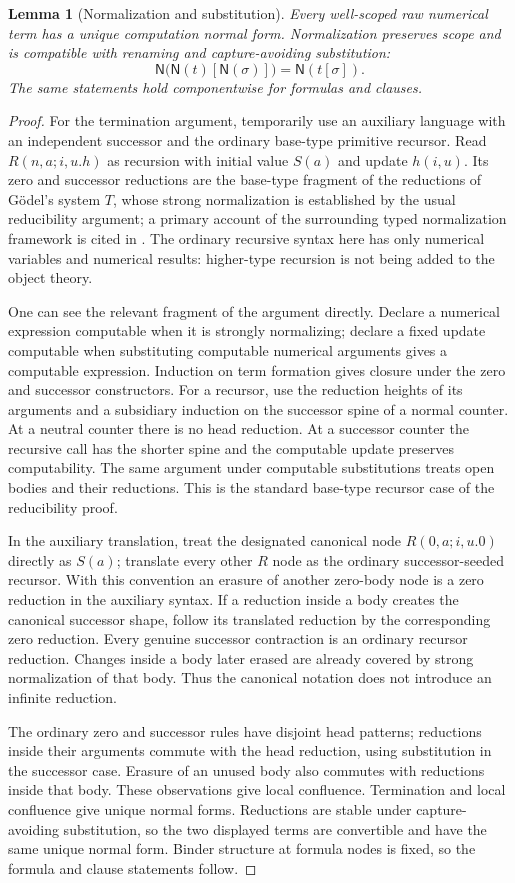 \documentclass[11pt,letterpaper]{article}
\newtheorem{lemma}[theorem]{Lemma}
\theoremstyle{definition}\newtheorem{definition}[theorem]{Definition}
\theoremstyle{remark}\newtheorem{remark}[theorem]{Remark}
\newcommand{\NF}{\mathsf N}
\begin{document}
\begin{lemma}[Normalization and substitution]\label{lem:norm}
Every well-scoped raw numerical term has a unique computation normal
form. Normalization preserves scope and is compatible with renaming
and capture-avoiding substitution:
\[
 \NF\bigl(\NF(t)[\NF(\sigma)]\bigr)=\NF(t[\sigma]).
\]
The same statements hold componentwise for formulas and clauses.
\end{lemma}
\begin{proof}
For the termination argument, temporarily use an auxiliary language with
an independent successor and the ordinary base-type primitive recursor.
Read $R(n,a;i,u.h)$ as recursion with initial value $S(a)$ and update
$h(i,u)$. Its zero and successor reductions are the base-type fragment
of the reductions of G\"odel's system $T$, whose strong normalization
is established by the usual reducibility argument; a primary account
of the surrounding typed normalization framework is cited in
\cite{urciuoli}. The ordinary recursive syntax here has only numerical
variables and numerical results: higher-type recursion is not being
added to the object theory.

One can see the relevant fragment of the argument directly. Declare
a numerical expression computable when it is strongly normalizing;
declare a fixed update computable when substituting computable
numerical arguments gives a computable expression. Induction on term
formation gives closure under the zero and successor constructors.
For a recursor, use the reduction heights of its arguments and a
subsidiary induction on the successor spine of a normal counter.
At a neutral counter there is no head reduction. At a successor
counter the recursive call has the shorter spine and the computable
update preserves computability. The same argument under computable
substitutions treats open bodies and their reductions. This is the
standard base-type recursor case of the reducibility proof.

In the auxiliary translation, treat the designated canonical node
$R(0,a;i,u.0)$ directly as $S(a)$; translate every other $R$ node as
the ordinary successor-seeded recursor. With this convention an erasure
of another zero-body node is a zero reduction in the auxiliary syntax.
If a reduction inside a body creates the canonical successor shape,
follow its translated reduction by the corresponding zero reduction.
Every genuine successor contraction
is an ordinary recursor reduction. Changes inside a body later erased
are already covered by strong normalization of that body. Thus the
canonical notation does not introduce an infinite reduction.

The ordinary zero and successor rules have disjoint head patterns;
reductions inside their arguments commute with the head reduction,
using substitution in the successor case. Erasure of an unused body
also commutes with reductions inside that body. These observations
give local confluence. Termination and local confluence give unique
normal forms. Reductions are stable under capture-avoiding
substitution, so the two displayed terms are convertible and have the
same unique normal form. Binder structure at formula nodes is fixed,
so the formula and clause statements follow.
\end{proof}
\end{document}
